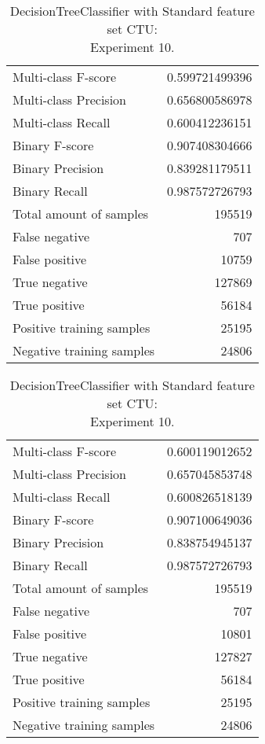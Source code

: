 \begin{table}[H]
\begin{minipage}{0.5\textwidth}
\caption{DecisionTreeClassifier with Standard feature set CTU: \\Experiment 9.}
\centering
\begin{tabular}{l r}
\toprule
Multi-class F-score & 0.599721499396 \\
Multi-class Precision & 0.656800586978 \\
Multi-class Recall & 0.600412236151 \\
\midrule
Binary F-score & 0.907408304666 \\
Binary Precision & 0.839281179511 \\
Binary Recall & 0.987572726793 \\
\midrule
Total amount of samples & 195519 \\
False negative & 707 \\
False positive & 10759 \\
True negative & 127869 \\
True positive & 56184 \\
\midrule
Positive training samples & 25195 \\
Negative training samples & 24806 \\
\bottomrule
\end{tabular}
\end{minipage}
\hfillx
\begin{minipage}{0.5\textwidth}
\caption{DecisionTreeClassifier with Standard feature set CTU: \\Experiment 10.}
\centering
\begin{tabular}{l r}
\toprule
Multi-class F-score & 0.600119012652 \\
Multi-class Precision & 0.657045853748 \\
Multi-class Recall & 0.600826518139 \\
\midrule
Binary F-score & 0.907100649036 \\
Binary Precision & 0.838754945137 \\
Binary Recall & 0.987572726793 \\
\midrule
Total amount of samples & 195519 \\
False negative & 707 \\
False positive & 10801 \\
True negative & 127827 \\
True positive & 56184 \\
\midrule
Positive training samples & 25195 \\
Negative training samples & 24806 \\
\bottomrule
\end{tabular}
\end{minipage}
\end{table}




